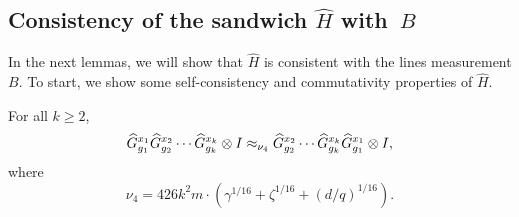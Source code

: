 \subsection{Consistency of the sandwich $\widehat{H}$ with~$B$}
\label{sec:ld-sandwiching}

In the next lemmas, we will show that $\widehat{H}$ is consistent with the lines
measurement $B$. To start, we show some self-consistency and
commutativity properties of $\widehat{H}$.



\begin{lemma}
\label{lem:commute-g-half-sandwich}
For all $k \geq 2$,
  \[ \widehat{G}^{x_1}_{g_1} \widehat{G}^{x_2}_{g_2} \cdots \widehat{G}^{x_k}_{g_k} \otimes I \approx_{\nu_4}
    \widehat{G}^{x_2}_{g_2} \cdots \widehat{G}^{x_k}_{g_k} \widehat{G}^{x_1}_{g_1} \otimes I, \]
where
\begin{equation*}
\nu_4 = 426 k^2 m \cdot \left(\gamma^{1/16} +\zeta^{1/16} +  (d/q)^{1/16}\right).
\end{equation*}
\end{lemma}
